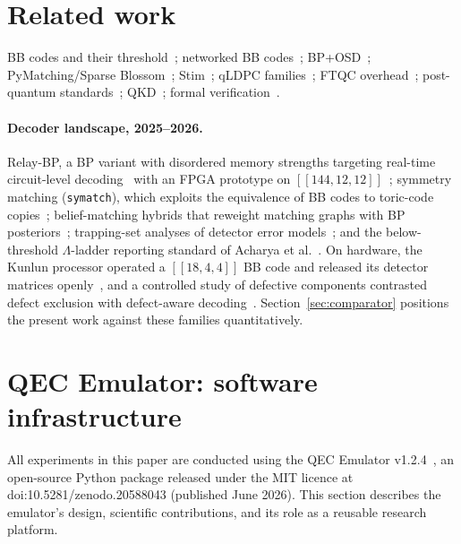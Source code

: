 \documentclass[11pt,a4paper]{article}
\begin{document}
\section{Related work}

BB codes and their threshold~\cite{Bravyi2024};
networked BB codes~\cite{ShawRengaswamy2026};
BP+OSD~\cite{Roffe2020,ldpcPackage};
PyMatching/Sparse Blossom~\cite{Higgott2023,SparseBlossom2025};
Stim~\cite{Gidney2021};
qLDPC families~\cite{TillichZemor2014,PanteleevKalachev2022,LeverrierZemor2022};
FTQC overhead~\cite{Gottesman2014,FawziGrospellierLeverrier2018,
ChristandlFawziGoswami2025};
post-quantum standards~\cite{NISTFIPS203,NISTFIPS204,NISTFIPS205};
QKD~\cite{BennettBrassard1984,ShorPreskill2000,PortmannRenner2022};
formal verification~\cite{RandPaykinZdancewic2018,Hietala2021,
Bordg2021,Lewis2023}.

\paragraph{Decoder landscape, 2025--2026.}
Relay-BP, a BP variant with disordered memory strengths targeting real-time
circuit-level decoding~\cite{Muller2025relay} with an FPGA prototype on
$[[144,12,12]]$~\cite{Johnson2026relayfpga};
symmetry matching (\texttt{symatch}), which exploits the equivalence of BB
codes to toric-code copies~\cite{SahayBrown2026};
belief-matching hybrids that reweight matching graphs with BP
posteriors~\cite{Higgott2023belief};
trapping-set analyses of detector error
models~\cite{Pacenti2026trapping};
and the below-threshold $\Lambda$-ladder reporting standard of
Acharya et al.~\cite{Acharya2024lambda}.
On hardware, the Kunlun processor operated a $[[18,4,4]]$ BB code and
released its detector matrices openly~\cite{Wang2026kunlun}, and a
controlled study of defective components contrasted defect exclusion with
defect-aware decoding~\cite{Bartlett2026defect}.
Section~\ref{sec:comparator} positions the present work against these
families quantitatively.

\section{QEC Emulator: software infrastructure}
\label{sec:emulator}

All experiments in this paper are conducted using the QEC Emulator
v1.2.4~\cite{AlDaajeh2026emulator}, an open-source Python package
released under the MIT licence at
doi:10.5281/zenodo.20588043 (published June 2026).
This section describes the emulator's design, scientific contributions,
and its role as a reusable research platform.
\end{document}
